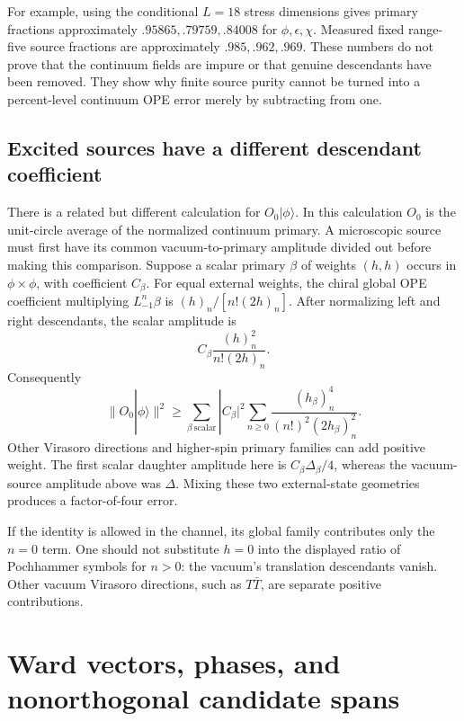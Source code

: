 For example, using the conditional $L=18$ stress dimensions gives
primary fractions approximately $.95865,.79759,.84008$ for
$\phi,\epsilon,\chi$. Measured fixed range-five source fractions are
approximately $.985,.962,.969$. These numbers do not prove that the
continuum fields are impure or that genuine descendants have been
removed. They show why finite source purity cannot be turned into a
percent-level continuum OPE error merely by subtracting from one.

\subsection{Excited sources have a different descendant coefficient}

There is a related but different calculation for $O_0|\phi\rangle$.
In this calculation $O_0$ is the unit-circle average of the normalized
continuum primary. A microscopic source must first have its common
vacuum-to-primary amplitude divided out before making this comparison.
Suppose a scalar primary $\beta$ of weights $(h,h)$ occurs in
$\phi\times\phi$, with coefficient $C_\beta$. For equal external
weights, the chiral global OPE coefficient multiplying
$L_{-1}^n\beta$ is $(h)_n/[n!(2h)_n]$. After normalizing left and right
descendants, the scalar amplitude is
\[
 C_\beta\frac{(h)_n^2}{n!(2h)_n}.
\]
Consequently
\begin{equation}
 \|O_0|\phi\rangle\|^2\geq
 \sum_{\beta\ \mathrm{scalar}}|C_\beta|^2
 \sum_{n\geq0}\frac{(h_\beta)_n^4}
 {(n!)^2(2h_\beta)_n^2}.
 \label{eq:excited-descendant-bound}
\end{equation}
Other Virasoro directions and higher-spin primary families can add
positive weight. The first scalar daughter amplitude here is
$C_\beta\Delta_\beta/4$, whereas the vacuum-source amplitude above
was $\Delta$. Mixing these two external-state geometries produces a
factor-of-four error.

If the identity is allowed in the channel, its global family contributes
only the $n=0$ term. One should not substitute $h=0$ into the displayed
ratio of Pochhammer symbols for $n>0$: the vacuum's translation
descendants vanish. Other vacuum Virasoro directions, such as
$T\bar T$, are separate positive contributions.

\section{Ward vectors, phases, and nonorthogonal candidate spans}

